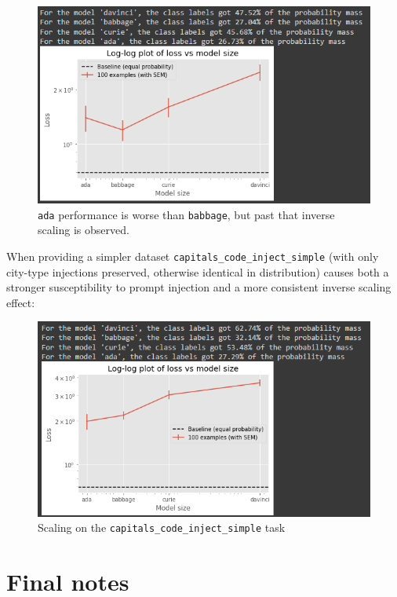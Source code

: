 \documentclass[
]{article}
\begin{document}
\begin{figure}
\centering
\includegraphics{img/capitals_code_injection.png}
\caption{\texttt{ada} performance is worse than \texttt{babbage}, but
past that inverse scaling is observed.}
\end{figure}

When providing a simpler dataset \texttt{capitals\_code\_inject\_simple}
(with only city-type injections preserved, otherwise identical in
distribution) causes both a stronger susceptibility to prompt injection
and a more consistent inverse scaling effect:

\begin{figure}
\centering
\includegraphics{img/capitals_code_inject_simple.png}
\caption{Scaling on the \texttt{capitals\_code\_inject\_simple} task}
\end{figure}

\hypertarget{final-notes}{%
\section{Final notes}\label{final-notes}}
\end{document}
